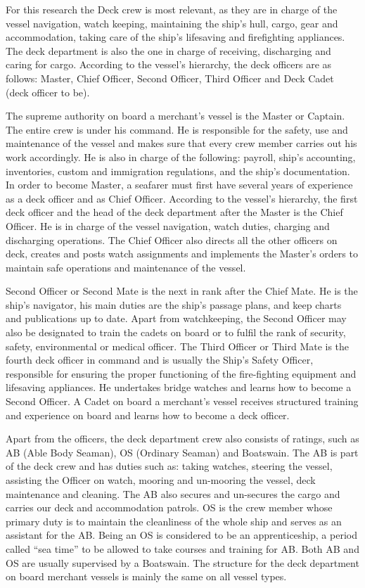 For this research the Deck crew is most relevant, as they are in charge of the vessel navigation, watch keeping, maintaining the ship’s hull, cargo, gear and accommodation, taking care of the ship’s lifesaving and firefighting appliances. The deck department is also the one in charge of receiving, discharging and caring for cargo. According to the vessel’s hierarchy, the deck officers are as follows: Master, Chief Officer, Second Officer, Third Officer and Deck Cadet (deck officer to be).

The supreme authority on board a merchant's vessel is the Master or Captain. The entire crew is under his command. He is responsible for the safety, use and maintenance of the vessel and makes sure that every crew member carries out his work accordingly. He is also in charge of the following: payroll, ship’s accounting, inventories, custom and immigration regulations, and the ship’s documentation. In order to become Master, a seafarer must first have several years of experience as a deck officer and as Chief Officer.
According to the vessel’s hierarchy, the first deck officer and the head of the deck department after the Master is the Chief Officer. He is in charge of the vessel navigation, watch duties, charging and discharging operations. The Chief Officer also directs all the other officers on deck, creates and posts watch assignments and implements the Master’s orders to maintain safe operations and maintenance of the vessel.

Second Officer or Second Mate is the next in rank after the Chief Mate. He is the ship’s navigator, his main duties are the ship’s passage plans, and keep charts and publications up to date. Apart from watchkeeping, the Second Officer may also be designated to train the cadets on board or to fulfil the rank of security, safety, environmental or medical officer.
The Third Officer or Third Mate is the fourth deck officer in command and is usually the Ship’s Safety Officer, responsible for ensuring the proper functioning of the fire-fighting equipment and lifesaving appliances. He undertakes bridge watches and learns how to become a Second Officer.
A Cadet on board a merchant's vessel receives structured training and experience on board and learns how to become a deck officer.

Apart from the officers, the deck department crew also consists of ratings, such as AB (Able Body Seaman), OS (Ordinary Seaman) and Boatswain.
The AB is part of the deck crew and has duties such as: taking watches, steering the vessel, assisting the Officer on watch, mooring and un-mooring the vessel, deck maintenance and cleaning. The AB also secures and un-secures the cargo and carries our deck and accommodation patrols.
OS is the crew member whose primary duty is to maintain the cleanliness of the whole ship and serves as an assistant for the AB. Being an OS is considered to be an apprenticeship, a period called “sea time” to be allowed to take courses and training for AB.
Both AB and OS are usually supervised by a Boatswain.
The structure for the deck department on board merchant vessels is mainly the same on all vessel types. \cite{Nedcon2013}

